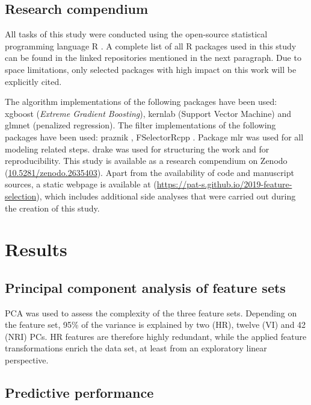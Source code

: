 \documentclass[remotesensing,article,submit,moreauthors,pdftex]{Definitions/mdpi}
\begin{document}
\subsection{Research compendium}

All tasks of this study were conducted using the open-source statistical programming language R \cite{rcoreteam2019}.
A complete list of all R packages used in this study can be found in the linked repositories mentioned in the next paragraph.
Due to space limitations, only selected packages with high impact on this work will be explicitly cited.

The algorithm implementations of the following packages have been used: xgboost \cite{chen2016} (\textit{Extreme Gradient Boosting}), kernlab \cite{kernlab} (Support Vector Machine) and glmnet \cite{glmnet} (penalized regression).
The filter implementations of the following packages have been used: praznik \cite{praznik}, FSelectorRcpp \cite{fselectorrcpp}.
Package mlr \cite{mlr} was used for all modeling related steps.
drake \cite{drake} was used for structuring the work and for reproducibility.
This study is available as a research compendium on Zenodo (\url{10.5281/zenodo.2635403}).
Apart from the availability of code and manuscript sources, a static webpage is available at (\url{https://pat-s.github.io/2019-feature-selection}), which includes additional side analyses that were carried out during the creation of this study.

\section{Results}

\subsection{Principal component analysis of feature sets}

PCA was used to assess the complexity of the three feature sets.
Depending on the feature set, 95\% of the variance is explained by two (HR), twelve (VI) and 42 (NRI) \ac{PC}s.
HR features are therefore highly redundant, while the applied feature transformations enrich the data set, at least from an exploratory linear perspective.

\subsection{Predictive performance}
\end{document}
